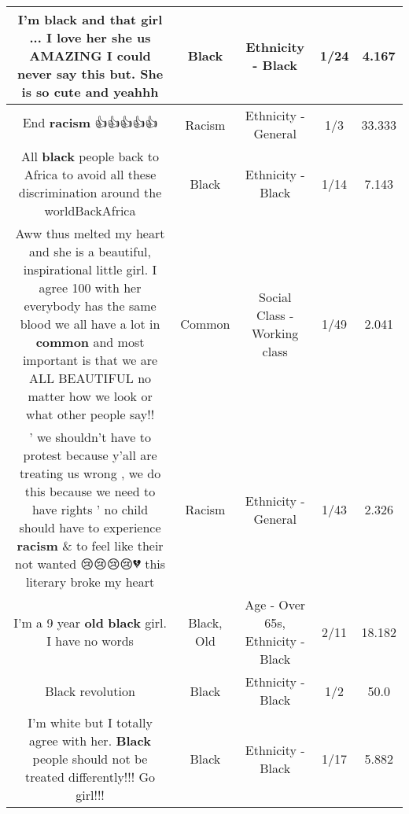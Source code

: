 \documentclass[11pt]{article}
\newlength\mylength
\begin{document}
\begin{center}
\begin{longtable}{|C{.65\mylength}|C{.30\mylength}|C{.12\mylength}|C{.12\mylength}|C{.12\mylength}|}
  \small I'm \textbf{black} and that girl ... I love her she us AMAZING I could never say this but. She is so cute and yeahhh\normalsize   & Black & Ethnicity - Black & 1/24 & 4.167 \\  \hline
  \small End \textbf{racism} 👍👍👍👍👍\normalsize   & Racism & Ethnicity - General & 1/3 & 33.333 \\  \hline
  \small All \textbf{black} people back to Africa to avoid all these discrimination around the worldBackAfrica\normalsize   & Black & Ethnicity - Black & 1/14 & 7.143 \\  \hline
  \small Aww thus melted my heart and she is a beautiful, inspirational little girl. I agree 100 with her everybody has the same blood we all have a lot in \textbf{common} and most important is that we are ALL BEAUTIFUL no matter how we look or what other people say!!\normalsize   & Common & Social Class - Working class & 1/49 & 2.041 \\  \hline
  \small ' we shouldn't have to protest because y'all are treating us wrong , we do this because we need to have rights ' no child should have to experience \textbf{racism} \& to feel like their not wanted 😢😢😢😢💔 this literary broke my heart\normalsize   & Racism & Ethnicity - General & 1/43 & 2.326 \\  \hline
  \small I'm a 9 year \textbf{old} \textbf{black} girl.  I have no words\normalsize   & Black, Old & Age - Over 65s, Ethnicity - Black & 2/11 & 18.182 \\  \hline
  \small Black revolution\normalsize   & Black & Ethnicity - Black & 1/2 & 50.0 \\  \hline
  \small I'm white but I totally agree with her. \textbf{Black} people should not be treated differently!!! Go girl!!!\normalsize   & Black & Ethnicity - Black & 1/17 & 5.882 \\  \hline

\end{longtable}
\end{center}
\end{document}
